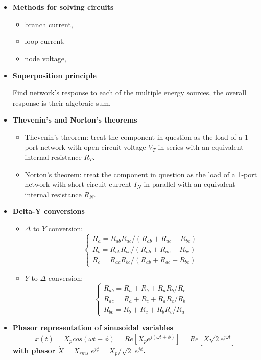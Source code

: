\begin{itemize}
\item \bf{Methods for solving circuits}
  \begin{itemize}
    \item branch current,  
    \item loop current, 
    \item node voltage, 
  \end{itemize}

\item \bf{Superposition principle}

  Find network's response to each of the multiple energy sources, the 
  overall response is their algebraic sum.

\item \bf{Thevenin's and Norton's theorems}
  \begin{itemize}
    \item Thevenin's theorem: treat the component in question as the load
      of a 1-port network with open-circuit voltage $V_T$ in series with
      an equivalent internal resistance $R_T$.
    \item Norton's theorem: treat the component in question as the load
      of a 1-port network with short-circuit current $I_N$ in parallel with
      an equivalent internal resistance $R_N$.
  \end{itemize}

\item \bf{Delta-Y conversions}
\begin{itemize}
\item $\Delta$ to $Y$ conversion:
\[ \left\{ \begin{array}{rr}
	R_a=R_{ab}R_{ac}/(R_{ab}+R_{ac}+R_{bc}) \\
	R_b=R_{ab}R_{bc}/(R_{ab}+R_{ac}+R_{bc}) \\
	R_c=R_{ac}R_{bc}/(R_{ab}+R_{ac}+R_{bc}) \end{array} \right. \]
\item $Y$ to $\Delta$ conversion:
\[ \left\{ \begin{array}{rr}
	R_{ab}=R_a+R_b+R_aR_b/R_c	\\
	R_{ac}=R_a+R_c+R_aR_c/R_b	\\
	R_{bc}=R_b+R_c+R_bR_c/R_a	\end{array} \right. \]
\end{itemize}

\item \bf{Phasor representation of sinusoidal variables}
\[ x(t)=X_p cos(\omega t+\phi)=Re[X_p e^{j(\omega t+\phi)}]
   =Re[\dot{X} \sqrt{2}e^{j\omega t}] \]
     with phasor $\dot{X}=X_{rms}\;e^{j\phi}=X_p/\sqrt{2}\;e^{j\phi}$.


\end{itemize}
